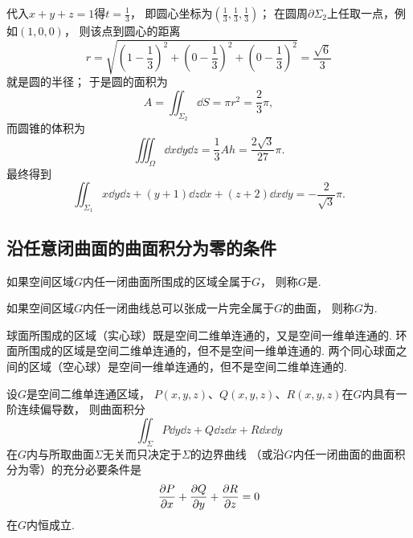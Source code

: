 \begin{example}
\begin{solution}
代入\(x+y+z=1\)得\(t=\frac13\)，
即圆心坐标为\((\frac13,\frac13,\frac13)\)；
在圆周\(\partial\Sigma_2\)上任取一点，例如\((1,0,0)\)，
则该点到圆心的距离\begin{equation*}
	r = \sqrt{
		\left( 1-\frac13 \right)^2
		+ \left( 0-\frac13 \right)^2
		+ \left( 0-\frac13 \right)^2
	}
	= \frac{\sqrt6}3
\end{equation*}
就是圆的半径；
于是圆的面积为\begin{equation*}
	A = \iint_{\Sigma_2} \dd{S}
	= \pi r^2
	= \frac23 \pi,
\end{equation*}
而圆锥的体积为\begin{equation*}
	\iiint_\Omega \dd{x}\dd{y}\dd{z}
	= \frac13 A h
	= \frac{2\sqrt3}{27} \pi.
\end{equation*}
最终得到\begin{equation*}
	\iint_{\Sigma_1} x \dd{y}\dd{z} + (y+1) \dd{z}\dd{x} + (z+2) \dd{x}\dd{y}
	= -\frac2{\sqrt3} \pi.
\end{equation*}
\end{solution}
\end{example}

\subsection{沿任意闭曲面的曲面积分为零的条件}
\begin{definition}
如果空间区域\(G\)内任一闭曲面所围成的区域全属于\(G\)，
则称\(G\)是.
\end{definition}

\begin{definition}
如果空间区域\(G\)内任一闭曲线总可以张成一片完全属于\(G\)的曲面，
则称\(G\)为.
\end{definition}

\begin{example}
球面所围成的区域（实心球）既是空间二维单连通的，又是空间一维单连通的.
环面所围成的区域是空间二维单连通的，但不是空间一维单连通的.
两个同心球面之间的区域（空心球）是空间一维单连通的，但不是空间二维单连通的.
\end{example}

\begin{theorem}\label{theorem:线积分与面积分.沿任意闭曲面的曲面积分为零的条件}
设\(G\)是空间二维单连通区域，
\(P(x,y,z)\)、\(Q(x,y,z)\)、\(R(x,y,z)\)在\(G\)内具有一阶连续偏导数，
则曲面积分\begin{equation*}
	\iint_\Sigma P\dd{y}\dd{z}+Q\dd{z}\dd{x}+R\dd{x}\dd{y}
\end{equation*}
在\(G\)内与所取曲面\(\Sigma\)无关而只决定于\(\Sigma\)的边界曲线
（或沿\(G\)内任一闭曲面的曲面积分为零）的充分必要条件是\begin{equation*}
	\pdv{P}{x}+\pdv{Q}{y}+\pdv{R}{z} = 0
\end{equation*}在\(G\)内恒成立.
\end{theorem}

